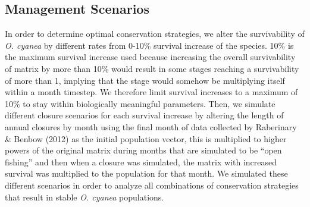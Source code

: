 \documentclass[
]{article}
\begin{document}
\hypertarget{management-scenarios}{%
\subsection{Management Scenarios}\label{management-scenarios}}

In order to determine optimal conservation strategies, we alter the survivability of \emph{O. cyanea} by different rates from 0-10\% survival increase of the species. 10\% is the maximum survival increase used because increasing the overall survivability of matrix by more than 10\% would result in some stages reaching a survivability of more than 1, implying that the stage would somehow be multiplying itself within a month timestep. We therefore limit survival increases to a maximum of 10\% to stay within biologically meaningful parameters. Then, we simulate different closure scenarios for each survival increase by altering the length of annual closures by month using the final month of data collected by Raberinary \& Benbow (2012) as the initial population vector, this is multiplied to higher powers of the original matrix during months that are simulated to be ``open fishing'' and then when a closure was simulated, the matrix with increased survival was multiplied to the population for that month. We simulated these different scenarios in order to analyze all combinations of conservation strategies that result in stable \emph{O. cyanea} populations.
\end{document}
